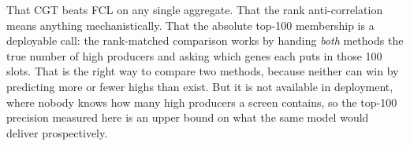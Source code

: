  That CGT beats FCL on any single aggregate. That the rank
anti-correlation means anything mechanistically. That the absolute top-100 membership is a
deployable call: the rank-matched comparison works by handing \emph{both} methods the true
number of high producers and asking which genes each puts in those 100 slots. That is the
right way to compare two methods, because neither can win by predicting more or fewer highs
than exist. But it is not available in deployment, where nobody knows how many high
producers a screen contains, so the top-100 precision measured here is an upper bound on
what the same model would deliver prospectively.
